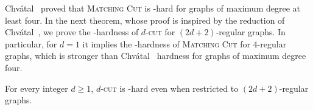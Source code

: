 \documentclass[a4paper,UKenglish,cleveref, autoref]{lipics-v2019}
\newcommand{\ig}[1]{\textcolor{red}{[Ig: #1]}}
\newcommand{\pname}[1]{\textsc{#1}}
\begin{document}
Chv\'atal~\cite{chvatal_matching_cut} proved that \textsc{Matching Cut} is \NP-hard for graphs of maximum degree at least four. In the next theorem, whose proof is inspired by the reduction of Chv\'atal~\cite{chvatal_matching_cut}, we prove the \NP-hardness of \pname{$d$-cut} for $(2d+2)$-regular graphs. In particular, for $d=1$ it implies the \NP-hardness of \pname{Matching Cut} for $4$-regular graphs, which is stronger than Chv\'atal~\cite{chvatal_matching_cut} hardness for graphs of maximum degree four.


\begin{theorem}
    \label{thm:regular_nph}
    For every integer $d \geq 1$, \pname{$d$-cut} is \NP-hard even when restricted to $(2d+2)$-regular graphs.
\end{theorem}

\end{document}

